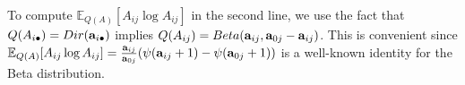 \documentclass{article}
\theoremstyle{plain}
\theoremstyle{definition}
\theoremstyle{proposition}
\theoremstyle{corollary}
\theoremstyle{lemma}
\theoremstyle{remark}
\theoremstyle{example}
\begin{document}
To compute $\mathbb E_{Q(A)}[A_{ij}\log A_{ij}]$ in the second line, we use the fact that $Q(A_{i \bullet}) =Dir(\bold a_{i \bullet})$ implies $Q(A_{i j}) =Beta(\bold a_{i j},\bold a_{0 j}-\bold a_{i j}) $. This is convenient since $\mathbb E_{Q(A)}[A_{ij}\log A_{ij}] = \frac{\bold a_{ij}}{ \bold a_{0j}}(\psi(\bold a_{ij}+1)-\psi(\bold a_{0j}+1))$ is a well-known identity for the Beta distribution.
\end{document}
